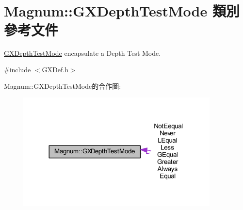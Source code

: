 \hypertarget{class_magnum_1_1_g_x_depth_test_mode}{}\section{Magnum\+:\+:G\+X\+Depth\+Test\+Mode 類別 參考文件}
\label{class_magnum_1_1_g_x_depth_test_mode}


\hyperlink{class_magnum_1_1_g_x_depth_test_mode}{G\+X\+Depth\+Test\+Mode} encapsulate a Depth Test Mode.  




{\ttfamily \#include $<$G\+X\+Def.\+h$>$}



Magnum\+:\+:G\+X\+Depth\+Test\+Mode的合作圖\+:\nopagebreak
\begin{figure}[H]
\begin{center}
\leavevmode
\includegraphics[width=288pt]{class_magnum_1_1_g_x_depth_test_mode__coll__graph}
\end{center}
\end{figure}
